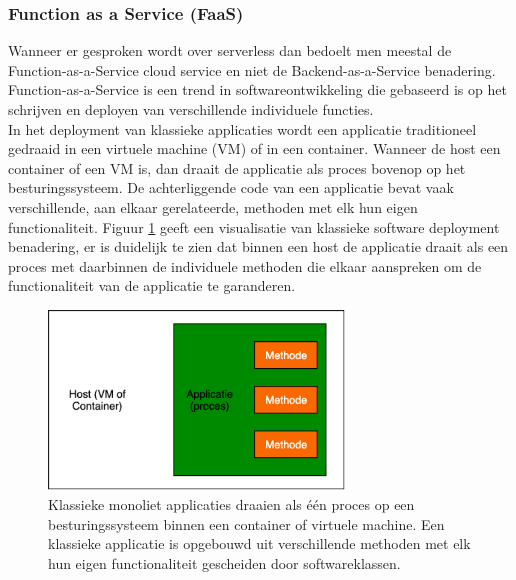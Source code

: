 \subsubsection{Function as a Service (FaaS)}
Wanneer er gesproken wordt over serverless dan bedoelt men meestal de Function-as-a-Service cloud service en niet de Backend-as-a-Service benadering.  Function-as-a-Service is een trend in softwareontwikkeling die gebaseerd is op het schrijven en deployen van verschillende individuele functies.  
\\
In het deployment van klassieke applicaties wordt een applicatie traditioneel gedraaid in een virtuele machine (VM) of in een container. Wanneer de host een container of een VM is, dan draait de applicatie als proces bovenop op het besturingssysteem. De achterliggende code van een applicatie bevat vaak verschillende, aan elkaar gerelateerde, methoden met elk hun eigen functionaliteit.  Figuur \ref{fig:traditional-software-deployment} geeft een visualisatie van klassieke software deployment benadering, er is duidelijk te zien dat binnen een host de applicatie draait als een proces met daarbinnen de individuele methoden die elkaar aanspreken om de functionaliteit van de applicatie te garanderen.
\begin{figure}
    \includegraphics[width=0.7\textwidth]{img/traditional_software_deployment.png}
    \caption{Klassieke monoliet applicaties draaien als één proces op een besturingssysteem binnen een container of virtuele machine. Een klassieke applicatie is opgebouwd uit verschillende methoden met elk hun eigen functionaliteit gescheiden door softwareklassen.} 
    \label{fig:traditional-software-deployment}  
\end{figure}
\\
